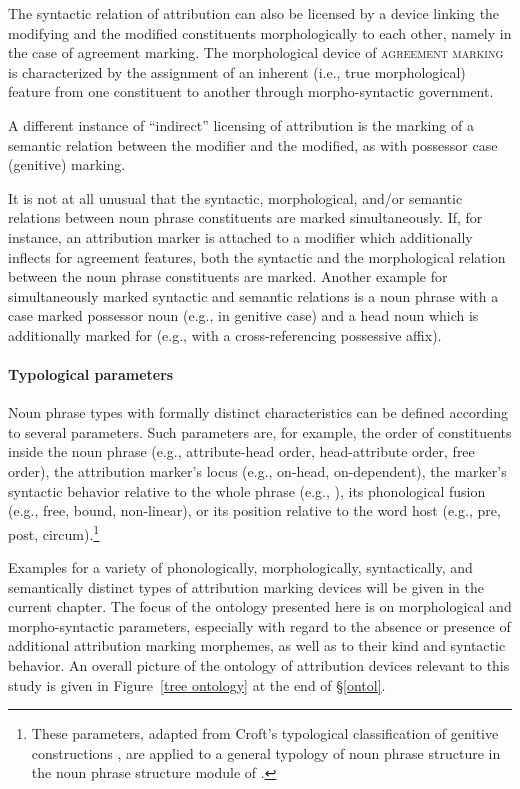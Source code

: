 The syntactic relation of attribution can also be licensed by a device linking the modifying and the modified constituents morphologically to each other, namely in the case of agreement marking. The morphological device of \textsc{agreement marking} is characterized by the assignment of an inherent (i.e., true morphological) feature from one constituent to another through morpho-syntactic government.

A different instance of “indirect” licensing of attribution is the marking of a semantic relation between the modifier and the modified, as with possessor case (genitive) marking.

It is not at all unusual that the syntactic, morphological, and/or semantic relations between noun phrase constituents are marked simultaneously. If, for instance, an attribution marker is attached to a modifier which additionally inflects for agreement features, both the syntactic and the morphological relation between the noun phrase constituents are marked. Another example for simultaneously marked syntactic and semantic relations is a noun phrase with a case marked possessor noun (e.g., in genitive case) and a head noun which is additionally marked for  (e.g., with a cross-referencing possessive affix).

\paragraph*{Typological parameters} 
Noun phrase types with formally distinct characteristics can be defined according to several parameters. Such parameters are, for example, the order of constituents inside the noun phrase (e.g., attribute-head order, head-attribute order, free order), the attribution marker's locus (e.g., on-head, on-dependent), the marker's syntactic behavior relative to the whole phrase (e.g., ), its phonological fusion (e.g., free, bound, non-linear), or its position relative to the word host (e.g., pre, post, circum).\footnote{These parameters, adapted from Croft's typological classification of genitive constructions \citep[93–94]{croft1995}, are applied to a general typology of noun phrase structure in the noun phrase structure module of  \citep[cf.][]{AUTOTYP-NP}.}

Examples for a variety of phonologically, morphologically, syntactically, and semantically distinct types of attribution marking devices will be given in the current chapter. The focus of the ontology presented here is on morphological and morpho-syntactic parameters, especially with regard to the absence or presence of additional attribution marking morphemes, as well as to their kind and syntactic behavior. An overall picture of the ontology of attribution devices relevant to this study is given in Figure~\ref{tree ontology} at the end of \S\ref{ontol}.

